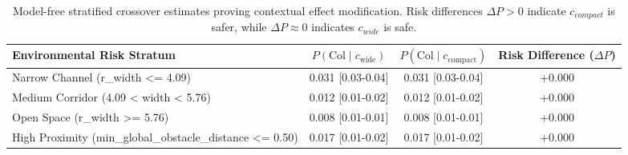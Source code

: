 \begin{table}[t]
\centering
\caption{Model-free stratified crossover estimates proving contextual effect modification. Risk differences $\Delta P > 0$ indicate $c_{compact}$ is safer, while $\Delta P \approx 0$ indicates $c_{wide}$ is safe.}
\label{tab:crossover_stratified}
\footnotesize
\begin{tabularx}{\columnwidth}{@{}X c c c@{}}
\toprule
\textbf{Environmental Risk Stratum} & \textbf{$P(\text{Col} \mid c_{\text{wide}})$} & \textbf{$P(\text{Col} \mid c_{\text{compact}})$} & \textbf{Risk Difference ($\Delta P$)} \\
\midrule
Narrow Channel (r_width <= 4.09) & 0.031 [0.03-0.04] & 0.031 [0.03-0.04] & +0.000 \\
Medium Corridor (4.09 < width < 5.76) & 0.012 [0.01-0.02] & 0.012 [0.01-0.02] & +0.000 \\
Open Space (r_width >= 5.76) & 0.008 [0.01-0.01] & 0.008 [0.01-0.01] & +0.000 \\
High Proximity (min_global_obstacle_distance <= 0.50) & 0.017 [0.01-0.02] & 0.017 [0.01-0.02] & +0.000 \\
\bottomrule
\end{tabularx}
\end{table}
